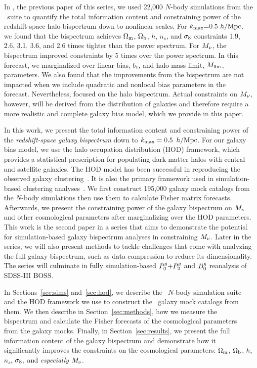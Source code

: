 In \cite{hahn2020}, the previous paper of this series, we used 22,000 $N$-body
simulations from the \quij~suite to quantify the total information content and
constraining power of the redshift-space halo bispectrum down to nonlinear scales. 
For $k_{\rm max}{=}0.5~h/{\rm Mpc}$, we found that the bispectrum achieves $\Omega_{\rm m}$,
$\Omega_{\rm b}$, $h$, $n_s$, and $\sigma_8$ constraints 1.9, 2.6, 3.1, 3.6, and 2.6 times
tighter than the power spectrum. For $M_\nu$, the bispectrum improved 
constraints by 5 times over the power spectrum. In this forecast, we marginalized 
over linear bias, $b_1$, and halo mass limit, $M_{\rm lim}$, parameters. We also found that the
improvements from the bispectrum are not impacted when we include quadratic 
and nonlocal bias parameters in the forecast. Nevertheless, \cite{hahn2020}
focused on the halo bispectrum. Actual constraints on $M_\nu$, however, will be 
derived from the distribution of galaxies and therefore require a more 
realistic and complete galaxy bias model, which we provide in this paper.

In this work, we present the total information content and constraining power
of the {\em redshift-space galaxy bispectrum} down to $k_{\rm max}= 0.5~\,h/\mathrm{Mpc}$. For our galaxy
bias model, we use the halo occupation distribution (HOD) framework, which provides a
statistical prescription for populating dark matter halos with central and satellite
galaxies. The HOD model has been successful in reproducing the observed galaxy
clustering~\citep[\emph{e.g.}][]{zheng2005, leauthaud2012, tinker2013, zentner2016, vakili2019}. 
It is also the primary framework used in simulation-based clustering
analyses~\citep[\eg][]{mcclintock2018, zhai2019, lange2019, wibking2019}. 
We first construct 195,000 galaxy mock catalogs from the \quij $N$-body
simulations then use them to calculate Fisher matrix forecasts. Afterwards, we
present the constraining power of the galaxy bispectrum on $M_\nu$ and other 
cosmological parameters after marginalizing over the HOD parameters. This work
is the second paper in a series that aims to demonstrate the potential for
simulation-based galaxy bispectrum analyses in constraining $M_\nu$. Later in
the series, we will also present methods to tackle challenges that come with
analyzing the full galaxy bispectrum, such as data compression to reduce its
dimensionality. The series will culminate in fully simulation-based $P^g_0{+}P^g_2$ and
$B^g_0$ reanalysis of SDSS-III BOSS. 

In Sections~\ref{sec:sims} and~\ref{sec:hod}, we describe the \quij~$N$-body simulation 
suite and the HOD framework we use to construct the \molino~galaxy mock catalogs from them. 
We then describe in Section~\ref{sec:methods}, how we measure the bispectrum and
calculate the Fisher forecasts of the cosmological parameters from the galaxy
mocks. Finally, in Section~\ref{sec:results}, we present the full information
content of the galaxy bispectrum and demonstrate how it significantly improves
the constraints on the cosmological parameters: $\Omega_{\rm m}$, $\Omega_{\rm b}$, $h$, $n_s$,
$\sigma_8$, and {\em especially} $M_\nu$. 
